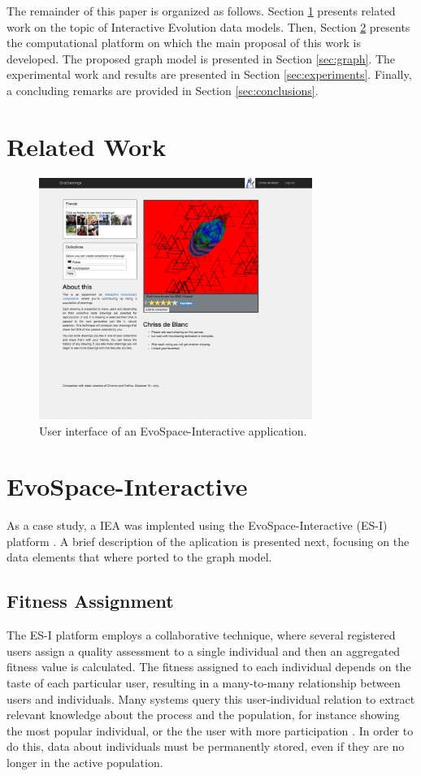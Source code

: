 \documentclass[conference]{IEEEtran}
\begin{document}
The remainder of this paper is organized as follows.
Section \ref{sec:interactive} presents related work on the topic 
of Interactive Evolution data models.
Then, Section \ref{sec:evospace-i} presents the computational platform on which 
the main proposal of this work is developed. The proposed graph model is 
presented in Section \ref{sec:graph}.
The experimental work and results are presented in Section \ref{sec:experiments}.
Finally, a concluding remarks are provided in Section \ref{sec:conclusions}.


\section{Related Work}
\label{sec:interactive}


\begin{figure}[!t]
    \centering
        \includegraphics[width=3.5in]{img/UI_ed01.png}
    \caption{User interface of an EvoSpace-Interactive application.}
    \label{fig:web}
\end{figure}

\section{EvoSpace-Interactive}
\label{sec:evospace-i} 
As a case study, a IEA was implented using the 
EvoSpace-Interactive (ES-I) platform \cite{garcia2013evospace}. %
A brief description of the aplication is presented next, focusing
on the data elements that where ported to the graph model.

\subsection{Fitness Assignment}
\label{sec:assignment}
The ES-I platform employs a collaborative technique,
where several registered users assign a quality assessment to a single
individual and then an aggregated fitness value is calculated. The fitness
assigned to each individual depends on the taste of each particular user, 
resulting in a many-to-many relationship between users and individuals. 
Many systems query this user-individual relation to extract relevant
knowledge about the process and the population, for instance showing the
most popular individual, or the the user with more participation 
\cite{picbreeder}.
In order to do this, data about individuals %
must be permanently stored, even
if they are no longer in the active population. 
\end{document}
